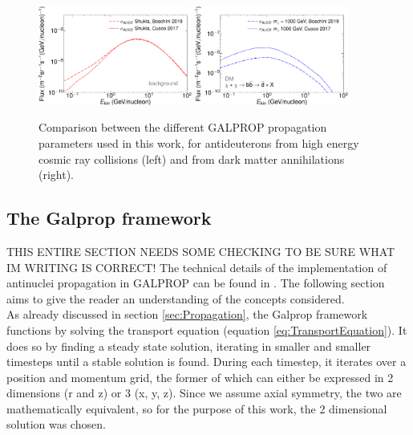 \begin{figure}
    \centering
    \includegraphics[width=0.45\textwidth]{figures/ComparisonPropagationBoschini.pdf}
    \includegraphics[width=0.45\textwidth]{figures/ComparisonPropagationBoschiniDM.pdf}
    \caption{Comparison between the different GALPROP propagation parameters used in this work, for antideuterons from high energy cosmic ray collisions (left) and from dark matter annihilations (right).}
    \label{fig:ComparisonPropagation}
\end{figure}

\subsection{The Galprop framework}\label{sec:GALPROP}
THIS ENTIRE SECTION NEEDS SOME CHECKING TO BE SURE WHAT IM WRITING IS CORRECT!
The technical details of the implementation of antinuclei propagation in GALPROP can be found in \cite{ALICE-PUBLIC-2022-002}. The following section aims to give the reader an understanding of the concepts considered.\\

As already discussed in section \ref{sec:Propagation}, the Galprop framework functions by solving the transport equation (equation \ref{eq:TransportEquation}). It does so by finding a steady state solution, iterating in smaller and smaller timesteps until a stable solution is found. During each timestep, it iterates over a position and momentum grid, the former of which can either be expressed in 2 dimensions (r and z) or 3 (x, y, z). Since we assume axial symmetry, the two are mathematically equivalent, so for the purpose of this work, the 2 dimensional solution was chosen. \\

